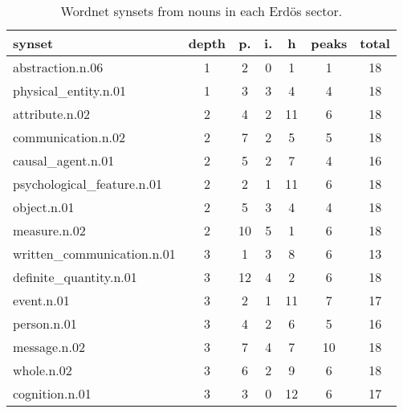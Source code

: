 \begin{table}[h!]
\begin{center}
\begin{tabular}{| l || c | c | c | c || c | c |}\hline
{\bf synset} & {\bf depth} & {\bf p.} & {\bf i.} & {\bf h} & {\bf peaks} & {\bf total} \\\hline\hline
abstraction.n.06 & 1  & 2  & 0  & 1  & 1  & 18 \\
physical\_entity.n.01 & 1  & 3  & 3  & 4  & 4  & 18 \\\hline
attribute.n.02 & 2  & 4  & 2  & 11  & 6  & 18 \\
communication.n.02 & 2  & 7  & 2  & 5  & 5  & 18 \\
causal\_agent.n.01 & 2  & 5  & 2  & 7  & 4  & 16 \\
psychological\_feature.n.01 & 2  & 2  & 1  & 11  & 6  & 18 \\
object.n.01 & 2  & 5  & 3  & 4  & 4  & 18 \\
measure.n.02 & 2  & 10  & 5  & 1  & 6  & 18 \\\hline
written\_communication.n.01 & 3  & 1  & 3  & 8  & 6  & 13 \\
definite\_quantity.n.01 & 3  & 12  & 4  & 2  & 6  & 18 \\
event.n.01 & 3  & 2  & 1  & 11  & 7  & 17 \\
person.n.01 & 3  & 4  & 2  & 6  & 5  & 16 \\
message.n.02 & 3  & 7  & 4  & 7  & 10  & 18 \\
whole.n.02 & 3  & 6  & 2  & 9  & 6  & 18 \\
cognition.n.01 & 3  & 3  & 0  & 12  & 6  & 17 \\\hline
\end{tabular}
\caption{Wordnet synsets from nouns in each Erd\"os sector.}
\end{center}
\end{table}